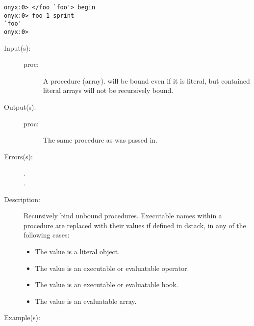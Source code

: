 \begin{description}
\begin{description}
\begin{verbatim}
onyx:0> </foo `foo'> begin
onyx:0> foo 1 sprint
`foo'
onyx:0>
		\end{verbatim}
	\end{description}
\label{systemdict:bind}
\item[{\onyxop{proc}{bind}{proc}}: ]
	\begin{description}\item[]
	\item[Input(s): ]
		\begin{description}\item[]
		\item[proc: ]
			A procedure (array).   will be bound even if
			it is literal, but contained literal arrays will not be
			recursively bound.
		\end{description}
	\item[Output(s): ]
		\begin{description}\item[]
		\item[proc: ]
			The same procedure as was passed in.
		\end{description}
	\item[Errors(s): ]
		\begin{description}\item[]
		\item[.]
		\item[.]
		\end{description}
	\item[Description: ]
		Recursively bind unbound procedures.  Executable names within a
		procedure are replaced with their values if defined in dstack,
		in any of the following cases:
		\begin{itemize}
		\item{The value is a literal object.}
		\item{The value is an executable or evaluatable operator.}
		\item{The value is an executable or evaluatable hook.}
		\item{The value is an evaluatable array.}
		\end{itemize}
	\item[Example(s): ]\begin{verbatim}


\end{verbatim}
\end{description}
\end{description}

